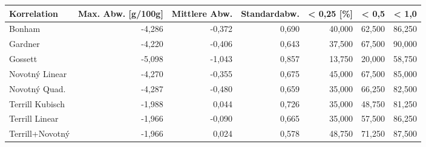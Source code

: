 \begin{tabular}{lrrrrrr}
\toprule
    Korrelation &  Max. Abw. [g/100g] &  Mittlere Abw. &  Standardabw. &  < 0,25 [\%] &  < 0,5 &  < 1,0 \\
\midrule
         Bonham &              -4,286 &         -0,372 &         0,690 &      40,000 & 62,500 & 86,250 \\
        Gardner &              -4,220 &         -0,406 &         0,643 &      37,500 & 67,500 & 90,000 \\
        Gossett &              -5,098 &         -1,043 &         0,857 &      13,750 & 20,000 & 58,750 \\
 Novotný Linear &              -4,270 &         -0,355 &         0,675 &      45,000 & 67,500 & 85,000 \\
  Novotný Quad. &              -4,287 &         -0,480 &         0,659 &      35,000 & 66,250 & 82,500 \\
Terrill Kubisch &              -1,988 &          0,044 &         0,726 &      35,000 & 48,750 & 81,250 \\
 Terrill Linear &              -1,966 &         -0,090 &         0,665 &      35,000 & 57,500 & 86,250 \\
Terrill+Novotný &              -1,966 &          0,024 &         0,578 &      48,750 & 71,250 & 87,500 \\
\bottomrule
\end{tabular}
